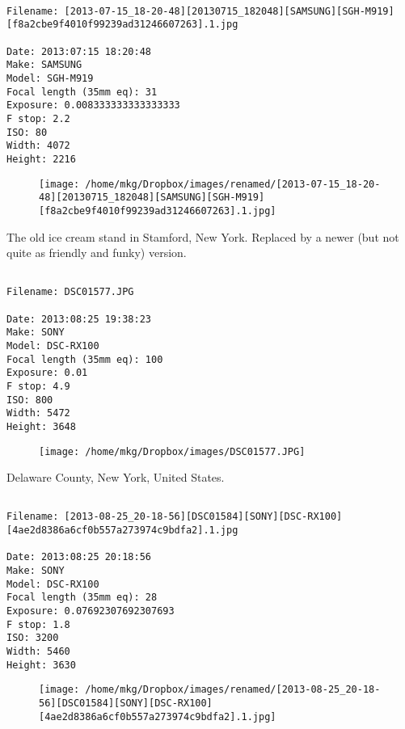 \clearpage
\onecolumn
\noindent 
\noindent
\begin{lstlisting}

Filename: [2013-07-15_18-20-48][20130715_182048][SAMSUNG][SGH-M919][f8a2cbe9f4010f99239ad31246607263].1.jpg

Date: 2013:07:15 18:20:48
Make: SAMSUNG
Model: SGH-M919
Focal length (35mm eq): 31
Exposure: 0.008333333333333333
F stop: 2.2
ISO: 80
Width: 4072
Height: 2216
\end{lstlisting}
\clearpage

\begin{figure}
\texttt{[image: /home/mkg/Dropbox/images/renamed/[2013-07-15\_18-20-48][20130715\_182048][SAMSUNG][SGH-M919][f8a2cbe9f4010f99239ad31246607263].1.jpg]}
\end{figure}
    
\clearpage
\onecolumn
\noindent The old ice cream stand in Stamford, New York. Replaced by a newer (but not quite as friendly and funky) version.
\noindent
\begin{lstlisting}

Filename: DSC01577.JPG

Date: 2013:08:25 19:38:23
Make: SONY
Model: DSC-RX100
Focal length (35mm eq): 100
Exposure: 0.01
F stop: 4.9
ISO: 800
Width: 5472
Height: 3648
\end{lstlisting}
\clearpage

\begin{figure}
\texttt{[image: /home/mkg/Dropbox/images/DSC01577.JPG]}
\end{figure}
    
\clearpage
\onecolumn
\noindent Delaware County, New York, United States.
\noindent
\begin{lstlisting}

Filename: [2013-08-25_20-18-56][DSC01584][SONY][DSC-RX100][4ae2d8386a6cf0b557a273974c9bdfa2].1.jpg

Date: 2013:08:25 20:18:56
Make: SONY
Model: DSC-RX100
Focal length (35mm eq): 28
Exposure: 0.07692307692307693
F stop: 1.8
ISO: 3200
Width: 5460
Height: 3630
\end{lstlisting}
\clearpage

\begin{figure}
\texttt{[image: /home/mkg/Dropbox/images/renamed/[2013-08-25\_20-18-56][DSC01584][SONY][DSC-RX100][4ae2d8386a6cf0b557a273974c9bdfa2].1.jpg]}
\end{figure}
    
